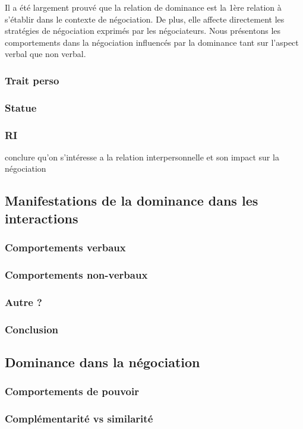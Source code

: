 \documentclass [french]{article}
\begin{document}
			Il a été largement prouvé que la relation de dominance est la 1ère relation à s'établir dans le contexte de négociation. De  plus, elle  affecte directement les stratégies de négociation exprimés par les négociateurs. Nous présentons les comportements dans la négociation influencés par la dominance tant sur l'aspect verbal que non verbal.
			\subsubsection{Trait perso}
			\subsubsection{Statue}
			\subsubsection{RI}
			
			conclure qu'on s'intéresse a la relation interpersonnelle et son impact sur la négociation 
			
			\subsection{Manifestations de la dominance dans les interactions}
				\subsubsection{Comportements verbaux}
				\subsubsection{Comportements non-verbaux}
				\subsubsection{Autre ?}
				\subsubsection{Conclusion}
				
			\subsection{Dominance dans la négociation}
			\subsubsection{Comportements de pouvoir}
			\subsubsection{Complémentarité vs similarité}
\end{document}
